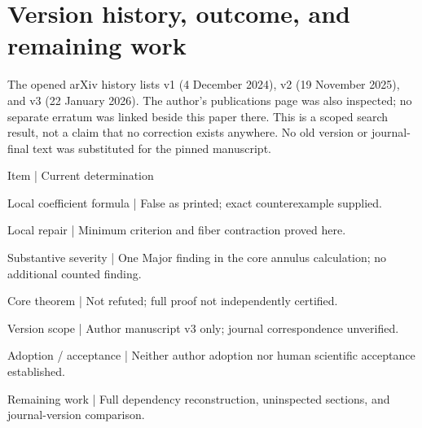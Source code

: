 \documentclass[10pt]{article}
\begin{document}
\section*{Version history, outcome, and remaining work}
The opened arXiv history lists v1 (4 December 2024), v2 (19 November 2025), and v3 (22 January 2026). The author’s publications page was also inspected; no separate erratum was linked beside this paper there. This is a scoped search result, not a claim that no correction exists anywhere. No old version or journal-final text was substituted for the pinned manuscript.\par
Item | Current determination\par
Local coefficient formula | False as printed; exact counterexample supplied.\par
Local repair | Minimum criterion and fiber contraction proved here.\par
Substantive severity | One Major finding in the core annulus calculation; no additional counted finding.\par
Core theorem | Not refuted; full proof not independently certified.\par
Version scope | Author manuscript v3 only; journal correspondence unverified.\par
Adoption / acceptance | Neither author adoption nor human scientific acceptance established.\par
Remaining work | Full dependency reconstruction, uninspected sections, and journal-version comparison.\par
\end{document}
